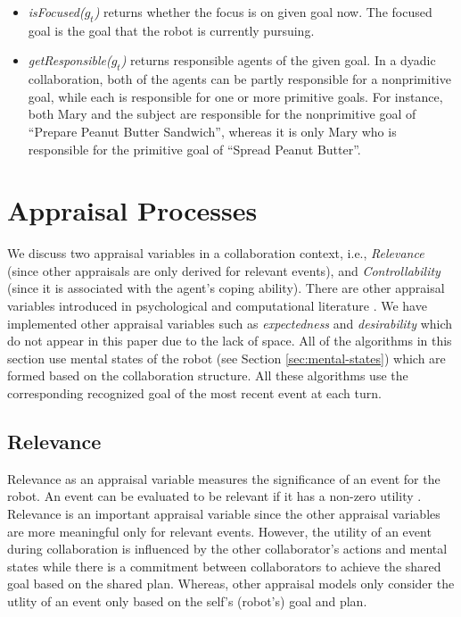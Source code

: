\documentclass{article}
\begin{document}
\begin{itemize}[leftmargin=2pt]
  \item \textit{isFocused($g_t$)} returns whether the focus is on given
  goal now. The focused goal is the goal that the robot is currently pursuing.
  
  \item \textit{getResponsible($g_t$)} returns responsible agents of the given
  goal. In a dyadic collaboration, both of the agents can be partly responsible
  for a nonprimitive goal, while each is responsible for one or more primitive
  goals. For instance, both Mary and the subject are responsible for the
  nonprimitive goal of ``Prepare Peanut Butter Sandwich'', whereas it is only
  Mary who is responsible for the primitive goal of ``Spread Peanut Butter''.
\end{itemize}

\vspace*{-3mm}
\section{Appraisal Processes}
\label{sec:appraisal-process}

We discuss two appraisal variables in a collaboration context, i.e.,
\textit{Relevance} (since other appraisals are only derived for relevant
events), and \textit{Controllability} (since it is associated with the agent's
coping ability). There are other appraisal variables introduced in psychological
\cite{scherer:appraisal-processes} and computational literature
\cite{gratch:domain-independent}. We have implemented other appraisal variables
such as \textit{expectedness} \cite{shayganfar:appraisal-short} and
\textit{desirability} which do not appear in this paper due to the lack of
space. All of the algorithms in this section use mental states of the robot (see
Section \ref{sec:mental-states}) which are formed based on the collaboration
structure. All these algorithms use the corresponding recognized goal of the
most recent event at each turn.

\subsection{Relevance}

Relevance as an appraisal variable measures the significance of an event for the
robot. An event can be evaluated to be relevant if it has a non-zero utility
\cite{marsella:ema-process-model}. Relevance is an important appraisal variable
since the other appraisal variables are more meaningful only for relevant
events. However, the utility of an event during collaboration is influenced by
the other collaborator's actions and mental states while there is a commitment
between collaborators to achieve the shared goal based on the shared plan.
Whereas, other appraisal models only consider the utlity of an event only based
on the self's (robot's) goal and plan. 
\end{document}
